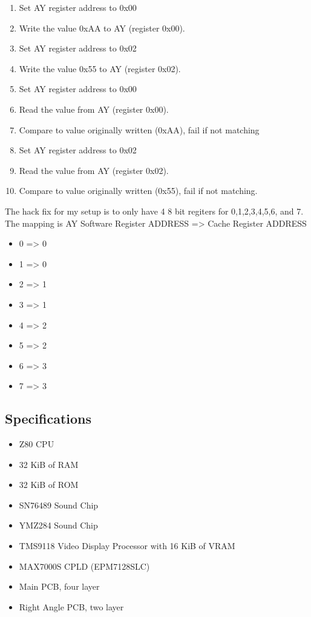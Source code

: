 \begin{enumerate}
  \item Set AY register address to 0x00
  \item Write the value 0xAA to AY (register 0x00).
  \item Set AY register address to 0x02
  \item Write the value 0x55 to AY (register 0x02).
  \item Set AY register address to 0x00
  \item Read the value from AY (register 0x00).
  \item Compare to value originally written (0xAA), fail if not matching
  \item Set AY register address to 0x02
  \item Read the value from AY (register 0x02).
  \item Compare to value originally written (0x55), fail if not matching.
\end{enumerate}

The hack fix for my setup is to only have 4 8 bit regiters for 0,1,2,3,4,5,6, and 7. The mapping is
AY Software Register ADDRESS => Cache Register ADDRESS

\begin{itemize}
  \item 0 => 0
  \item 1 => 0
  \item 2 => 1
  \item 3 => 1
  \item 4 => 2
  \item 5 => 2
  \item 6 => 3
  \item 7 => 3
\end{itemize}

\subsection{Specifications}

\par
\begin{itemize}
  \item Z80 CPU
  \item 32 KiB of RAM
  \item 32 KiB of ROM
  \item SN76489 Sound Chip
  \item YMZ284 Sound Chip
  \item TMS9118 Video Display Processor with 16 KiB of VRAM
  \item MAX7000S CPLD (EPM7128SLC)
  \item Main PCB, four layer
  \item Right Angle PCB, two layer
\end{itemize}

